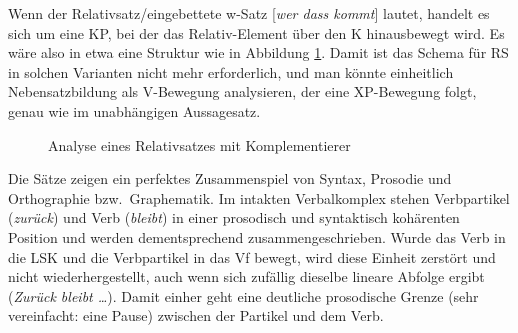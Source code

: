 
Wenn der Relativsatz\slash eingebettete w-Satz [\textit{wer dass kommt}] lautet, handelt es sich um eine KP, bei der das Relativ-Element über den K hinausbewegt wird.
Es wäre also in etwa eine Struktur wie in Abbildung \ref{fig:relativsatzzmitkomp}.
Damit ist das Schema für RS in solchen Varianten nicht mehr erforderlich, und man könnte einheitlich Nebensatzbildung als V-Bewegung analysieren, der eine XP-Bewegung folgt, genau wie im unabhängigen Aussagesatz.

\begin{figure}
  \begin{center}
  \end{center}
  \caption{Analyse eines Relativsatzes mit Komplementierer}
  \label{fig:relativsatzzmitkomp}
\end{figure}


Die Sätze zeigen ein perfektes Zusammenspiel von Syntax, Prosodie und Orthographie bzw.\ Graphematik.
Im intakten Verbalkomplex stehen Verbpartikel (\textit{zurück}) und Verb (\textit{bleibt}) in einer prosodisch und syntaktisch kohärenten Position und werden dementsprechend zusammengeschrieben.
Wurde das Verb in die LSK und die Verbpartikel in das Vf bewegt, wird diese Einheit zerstört und nicht wiederhergestellt, auch wenn sich zufällig dieselbe lineare Abfolge ergibt (\textit{Zurück bleibt \ldots}).
Damit einher geht eine deutliche prosodische Grenze (sehr vereinfacht: eine Pause) zwischen der Partikel und dem Verb.



